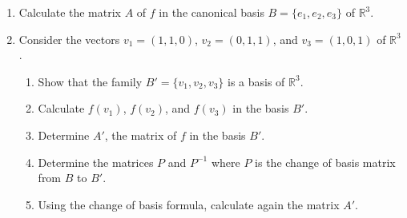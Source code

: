 \documentclass[12pt]{article}
\begin{document}
\begin{enumerate}
    \item Calculate the matrix $A$ of $f$ in the canonical basis $B = \{e_1, e_2, e_3\}$ of $\mathbb{R}^3$.
    
    \item Consider the vectors $v_1 = (1,1,0)$, $v_2 = (0,1,1)$, and $v_3 = (1,0,1)$ of $\mathbb{R}^3$.
    \begin{enumerate}
        \item Show that the family $B' = \{v_1, v_2, v_3\}$ is a basis of $\mathbb{R}^3$.
        \item Calculate $f(v_1)$, $f(v_2)$, and $f(v_3)$ in the basis $B'$.
        \item Determine $A'$, the matrix of $f$ in the basis $B'$.
        \item Determine the matrices $P$ and $P^{-1}$ where $P$ is the change of basis matrix from $B$ to $B'$.
        \item Using the change of basis formula, calculate again the matrix $A'$.
    \end{enumerate}
\end{enumerate}

\newpage
\end{document}
